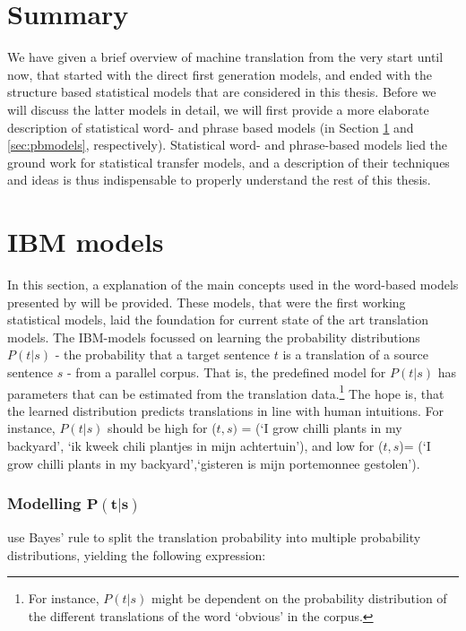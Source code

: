 \section*{Summary}
We have given a brief overview of machine translation from the very start until now, that started with the direct first generation models, and ended with the structure based statistical models that are considered in this thesis. Before we will discuss the latter models in detail, we will first provide a more elaborate description of statistical word- and phrase based models (in Section \ref{sec:IBM} and \ref{sec:pbmodels}, respectively). Statistical word- and phrase-based models lied the ground work for statistical transfer models, and a description of their techniques and ideas is thus indispensable to properly understand the rest of this thesis.

\section{IBM models}
\label{sec:IBM}

In this section, a explanation of the main concepts used in the word-based models presented by \cite{brown1993mathematics} will be provided. These models, that were the first working statistical models, laid the foundation for current state of the art translation models. The IBM-models focussed on learning the probability distributions $P(t|s)$ - the probability that a target sentence $t$ is a translation of a source sentence $s$ - from a parallel corpus. That is, the predefined model for $P(t|s)$ has parameters that can be estimated from the translation data.\footnote{For instance, $P(t|s)$ might be dependent on the probability distribution of the different translations of the word `obvious' in the corpus.} The hope is, that the learned distribution predicts translations in line with human intuitions. For instance, $P(t|s)$ should be high for ($t,s)$ = (`I grow chilli plants in my backyard', `ik kweek chili plantjes in mijn achtertuin'), and low for ($t,s$)= (`I grow chilli plants in my backyard',`gisteren is mijn portemonnee gestolen').

\subsubsection{Modelling $\mathbf{P(t|s)}$}
\citeauthor{brown1988statistical} use Bayes' rule to split the translation probability into multiple probability distributions, yielding the following expression:

